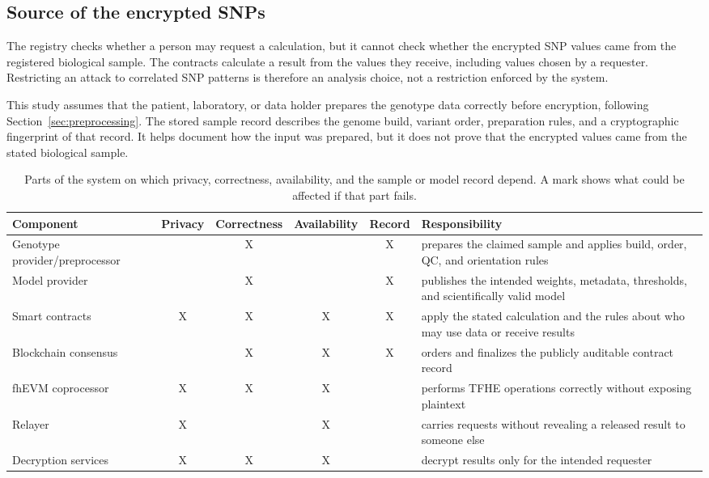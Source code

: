 \documentclass[10pt]{article}
\begin{document}
\subsection{Source of the encrypted SNPs}

The registry checks whether a person may request a calculation, but it cannot check
whether the encrypted SNP values came from the registered biological sample.  The
contracts calculate a result from the values they receive, including values chosen by a
requester.  Restricting an attack to correlated SNP patterns is therefore an analysis
choice, not a restriction enforced by the system.

This study assumes that the patient, laboratory, or data holder prepares the genotype
data correctly before encryption, following Section~\ref{sec:preprocessing}.  The
stored sample record describes the genome build, variant order, preparation rules, and
a cryptographic fingerprint of that record.  It helps document how the input was prepared, but it does not prove
that the encrypted values came from the stated biological sample.

\begin{table}[t]
\centering
\caption{Parts of the system on which privacy, correctness, availability, and the
sample or model record depend. A mark shows what could be affected if that part fails.}
\label{tab:trust_boundary}
\small
\begin{tabularx}{\textwidth}{@{}XccccX@{}}
\toprule
\textbf{Component} & \textbf{Privacy} & \textbf{Correctness} & \textbf{Availability} & \textbf{Record} & \textbf{Responsibility} \\
\midrule
Genotype provider/preprocessor &  & X &  & X & prepares the claimed sample and applies build, order, QC, and orientation rules \\
Model provider &  & X &  & X & publishes the intended weights, metadata, thresholds, and scientifically valid model \\
Smart contracts & X & X & X & X & apply the stated calculation and the rules about who may use data or receive results \\
Blockchain consensus &  & X & X & X & orders and finalizes the publicly auditable contract record \\
fhEVM coprocessor & X & X & X &  & performs TFHE operations correctly without exposing plaintext \\
Relayer & X &  & X &  & carries requests without revealing a released result to someone else \\
Decryption services & X & X & X &  & decrypt results only for the intended requester \\
\bottomrule
\end{tabularx}
\end{table}
\end{document}
